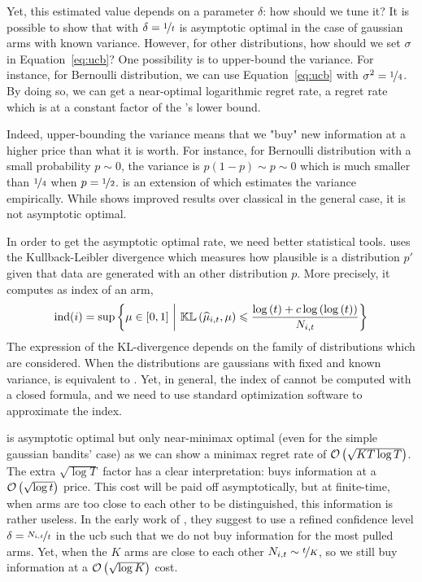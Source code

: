 {Yet, this estimated value depends on a parameter $\delta$: how should we tune it? It is possible to show that \UCB with $\delta = \nicefrac{1}{t}$ is asymptotic optimal in the case of gaussian arms with known variance. However, for other distributions, how should we set $\sigma$ in Equation~\ref{eq:ucb}? One possibility is to upper-bound the variance. For instance, for Bernoulli distribution, we can use Equation~\ref{eq:ucb} with $\sigma^2 = \nicefrac{1}{4}$. By doing so, we can get a near-optimal logarithmic regret rate, \ie a regret rate which is at a constant factor of the \citet{lai1985asymptotically}'s lower bound.

Indeed, upper-bounding the variance means that we "buy" new information at a higher price than what it is worth. For instance, for Bernoulli distribution with a small probability $p\sim 0$, the variance is $p(1-p) \sim p \sim 0$ which is much smaller than $\nicefrac{1}{4}$ when $p=\nicefrac{1}{2}$. \UCBV \citep{audibert2009ucbv} is an extension of \UCB which estimates the variance empirically. While \UCBV shows improved results over classical \UCB in the general case, it is not asymptotic optimal. 

In order to get the asymptotic optimal rate, we need better statistical tools. \KLUCB \citep{cappe2013klucb} uses the Kullback-Leibler divergence which measures how plausible is a distribution $p'$ given that data are generated with an other distribution $p$. More precisely, it computes as index of an arm, 
\begin{equation}
\label{eq:klucb}
\text{ind}(i) = \sup \left\{\mu \in[0,1]\ \bigg{|}\  \mathbb{KL}\left(\hat{\mu}_{i,t}, \mu\right) \leqslant \frac{\log\pa{t} + c\log\pa{\log\pa{t}}}{N_{i,t}} \right\}
\end{equation}
 The expression of the KL-divergence depends on the family of distributions which are considered. When the distributions are gaussians with fixed and known variance, \KLUCB is equivalent to \UCB. Yet, in general, the index of \KLUCB cannot be computed with a closed formula, and we need to use standard optimization software to approximate the index.

\KLUCB is asymptotic optimal but only near-minimax optimal (even for the simple gaussian bandits' case) as we can show a minimax regret rate of $\mathcal{O}\left(\sqrt{KT\log T}\right)$. The extra $\sqrt{\log T}$ factor has a clear interpretation: \UCB buys information at a $\mathcal{O}\left(\sqrt{\log t}\right)$ price. This cost will be paid off asymptotically, but at finite-time, when arms are too close to each other to be distinguished, this information is rather useless. In the early work of \citet{lai1987adaptive}, they suggest to use a refined confidence level $\delta = \nicefrac{N_{i,t}}{t}$ in the ucb such that we do not buy information for the most pulled arms. Yet, when the $K$ arms are close to each other $N_{i,t} \sim \nicefrac{t}{K}$, so we still buy information at a $\mathcal{O}\left(\sqrt{\log K}\right)$ cost. 

}
